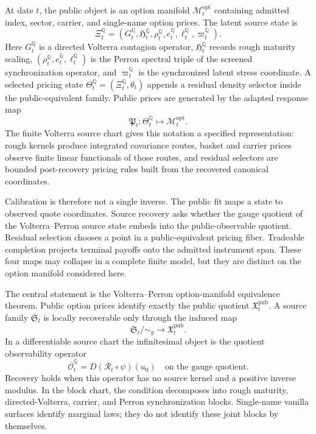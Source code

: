 \documentclass[11pt,a4paper]{amsart}
\theoremstyle{plain}
\theoremstyle{definition}
\theoremstyle{remark}
\newcommand{\QQ}{\mathbb{Q}}
\newcommand{\cM}{\mathcal{M}}
\begin{document}
At date \(t\), the public object is an option manifold \(\cM_t^{\mathrm{opt}}\) containing admitted
index, sector, carrier, and single-name option prices.  The latent source state is
\[
        \Xi_t^\QQ
        =
        (G_t^\QQ,\mathfrak{H}_t^\QQ,\rho_t^\QQ,e_t^\QQ,\ell_t^\QQ,\varpi_t^\QQ).
\]
Here \(G_t^\QQ\) is a directed Volterra contagion operator, \(\mathfrak{H}_t^\QQ\) records rough
maturity scaling, \((\rho_t^\QQ,e_t^\QQ,\ell_t^\QQ)\) is the Perron spectral triple of the screened
synchronization operator, and \(\varpi_t^\QQ\) is the synchronized latent stress coordinate.  A
selected pricing state \(\Theta_t^\QQ=(\Xi_t^\QQ,\theta_t)\) appends a residual density selector
inside the public-equivalent family.  Public prices are generated by the adapted response map
\[
        \mathfrak P_t:\Theta_t^\QQ\longmapsto \cM_t^{\mathrm{opt}} .
\]
The finite Volterra source chart gives this notation a specified representation: rough kernels
produce integrated covariance routes, basket and carrier prices observe finite linear functionals
of those routes, and residual selectors are bounded post-recovery pricing rules built from the
recovered canonical coordinates.

Calibration is therefore not a single inverse.  The public fit maps a state to observed quote
coordinates.  Source recovery asks whether the gauge quotient of the Volterra--Perron source state
embeds into the public-observable quotient.  Residual selection chooses a point in a
public-equivalent pricing fiber.  Tradeable completion projects terminal payoffs onto the admitted
instrument span.  These four maps may collapse in a complete finite model, but they are distinct
on the option manifold considered here.

The central statement is the Volterra--Perron option-manifold equivalence theorem.  Public option
prices identify exactly the public quotient \(\mathfrak X_t^{\mathrm{pub}}\).  A source family
\(\mathfrak S_t\) is locally recoverable only through the induced map
\[
        \mathfrak S_t/\!\sim_g\longrightarrow \mathfrak X_t^{\mathrm{pub}} .
\]
In a differentiable source chart the infinitesimal object is the quotient observability operator
\[
        \overline{\mathcal O}_t^\QQ
        =
        D(\mathcal R_t\circ\psi)(u_0)\quad\text{on the gauge quotient}.
\]
Recovery holds when this operator has no source kernel and a positive inverse modulus.  In the
block chart, the condition decomposes into rough maturity, directed-Volterra, carrier, and Perron
synchronization blocks.  Single-name vanilla surfaces identify marginal laws; they do not identify
these joint blocks by themselves.
\end{document}
